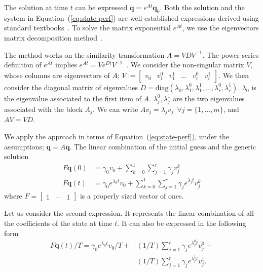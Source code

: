 \documentclass[letterpaper,10pt,conference]{ieeeconf}
\theoremstyle{definition}
\begin{document}
The solution at time $t$ can be expressed $\mathbf{q}=e^{At}\mathbf{q}_0$. Both the solution and the system in Equation~(\ref{eq:state-perf}) are well established expressions derived using standard textbooks~\cite{kuo1967automatic, ogata2002modern}. To solve the matrix exponential $e^{At}$, we use the eigenvectors matrix decomposition method~\cite{moler2003nineteen}.

The method works on the similarity transformation $A=VDV^{-1}$. The power series definition of $e^{At}$ implies $e^{At}=Ve^{Dt}V^{-1}$~\cite{moler2003nineteen}. We consider the non-singular matrix $V$, whose columns are eigenvectors of $A$; $V:=\begin{bmatrix}v_0 & v_1^0 & v_1^1 & \dots & v_r^0 & v_r^1\end{bmatrix}$. We then consider the diagonal matrix of eigenvalues $D=\mathrm{diag}{(\lambda_0,\lambda_1^0,\lambda_1^1,\dots,\lambda_r^0,\lambda_r^1)}$. $\lambda_0$ is the eigenvalue associated to the first item of $A$. $\lambda_j^0,\lambda_j^1$ are the two eigenvalues associated with the block $A_j$. We can write $Av_j=\lambda_jv_j\,\,\,\forall j=\{1,\dots,m\}$, and $AV=VD$. 

We apply the approach in terms of Equation~(\ref{eq:state-perf}), under the assumptions; $\dot{\mathbf{q}}=A\mathbf{q}$. The linear combination of the initial guess and the generic solution
\begin{equation*}\begin{split}
  F\mathbf{q}(0)&=\gamma_0 v_0+\sum_{k=0}^{1}{\sum_{j=1}^{r}{\gamma_j v_j^k}}\\
  F\mathbf{q}(t)&=\gamma_0 e^{\lambda_0 t} v_0+\sum_{k=0}^{1}{\sum_{j=1}^{r}{\gamma_j e^{\lambda_j t} v_j^k}}
\end{split}\end{equation*}
where $F=\begin{bmatrix}1 & \cdots & 1\end{bmatrix}$ is a properly sized vector of ones. 

Let us consider the second expression. It represents the linear combination of all the coefficients of the state at time $t$. It can also be expressed in the following form
\begin{equation}\label{eq:proof-output}\begin{split}
  F\mathbf{q}(t)/T=\gamma_0 e^{\lambda_0t}v_0/T+&(1/T)\sum_{j=1}^r{\gamma_j e^{\lambda_j^0t}v_j^0}+\\&(1/T)\sum_{j=1}^r{\gamma_j e^{\lambda_j^1t}v_j^1}.
\end{split}\end{equation}
\end{document}
